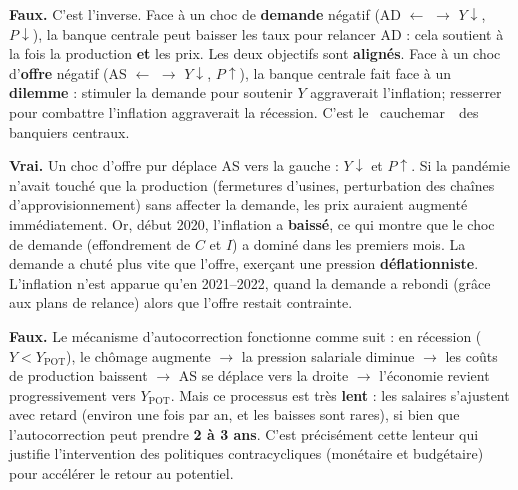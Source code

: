 
\begin{reponse}
\textbf{Faux.} C'est l'inverse. Face à un choc de \textbf{demande} négatif (AD $\leftarrow$ $\to$ $Y \downarrow$, $P \downarrow$), la banque centrale peut baisser les taux pour relancer AD : cela soutient à la fois la production \textbf{et} les prix. Les deux objectifs sont \textbf{alignés}. Face à un choc d'\textbf{offre} négatif (AS $\leftarrow$ $\to$ $Y \downarrow$, $P \uparrow$), la banque centrale fait face à un \textbf{dilemme} : stimuler la demande pour soutenir $Y$ aggraverait l'inflation; resserrer pour combattre l'inflation aggraverait la récession. C'est le \guillemotleft~cauchemar~\guillemotright\ des banquiers centraux.
\end{reponse}


\begin{reponse}
\textbf{Vrai.} Un choc d'offre pur déplace AS vers la gauche : $Y \downarrow$ et $P \uparrow$. Si la pandémie n'avait touché que la production (fermetures d'usines, perturbation des chaînes d'approvisionnement) sans affecter la demande, les prix auraient augmenté immédiatement. Or, début 2020, l'inflation a \textbf{baissé}, ce qui montre que le choc de demande (effondrement de $C$ et $I$) a dominé dans les premiers mois. La demande a chuté plus vite que l'offre, exerçant une pression \textbf{déflationniste}. L'inflation n'est apparue qu'en 2021--2022, quand la demande a rebondi (grâce aux plans de relance) alors que l'offre restait contrainte.
\end{reponse}


\begin{reponse}
\textbf{Faux.} Le mécanisme d'autocorrection fonctionne comme suit : en récession ($Y < Y_{\text{POT}}$), le chômage augmente $\to$ la pression salariale diminue $\to$ les coûts de production baissent $\to$ AS se déplace vers la droite $\to$ l'économie revient progressivement vers $Y_{\text{POT}}$. Mais ce processus est très \textbf{lent} : les salaires s'ajustent avec retard (environ une fois par an, et les baisses sont rares), si bien que l'autocorrection peut prendre \textbf{2 à 3 ans}. C'est précisément cette lenteur qui justifie l'intervention des politiques contracycliques (monétaire et budgétaire) pour accélérer le retour au potentiel.
\end{reponse}

